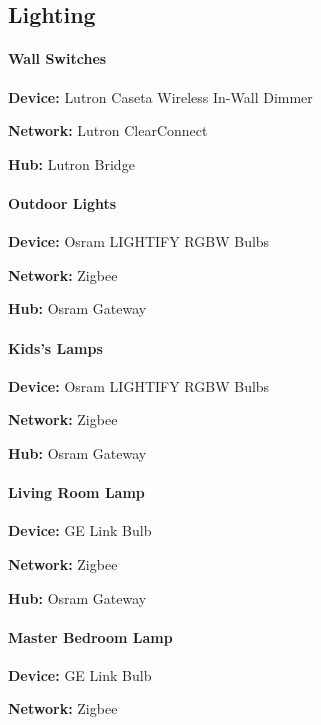 \documentclass[]{article}
\let\oldparagraph\paragraph
\renewcommand{\paragraph}[1]{\oldparagraph{#1}\mbox{}}
\begin{document}
\begin{multicols}{2}
\subsection{\texorpdfstring{{Lighting}}{Lighting}}

\paragraph{\texorpdfstring{{Wall Switches}}{Wall Switches}}

\textbf{Device: }
{Lutron Caseta Wireless In-Wall Dimmer}

\textbf{Network: }
{Lutron ClearConnect}

\textbf{Hub: }
{Lutron Bridge}

\paragraph{\texorpdfstring{{Outdoor Lights}}{Outdoor Lights}}

\textbf{Device: }
{Osram LIGHTIFY RGBW Bulbs}

\textbf{Network: }
{Zigbee}

\textbf{Hub: }
{Osram Gateway}

\paragraph{\texorpdfstring{{Kids's Lamps}}{Kid's Lamps}}

\textbf{Device: }
{Osram LIGHTIFY RGBW Bulbs}

\textbf{Network: }
{Zigbee}

\textbf{Hub: }
{Osram Gateway}

\paragraph{\texorpdfstring{{Living Room Lamp}}{Living Room Lamp}}

\textbf{Device: }
{GE Link Bulb}

\textbf{Network: }
{Zigbee}

\textbf{Hub: }
{Osram Gateway}

\paragraph{\texorpdfstring{{Master Bedroom Lamp}}{Master Bedroom Lamp}}

\textbf{Device: }
{GE Link Bulb}

\textbf{Network: }
{Zigbee}


\end{multicols}
\end{document}
